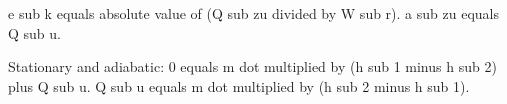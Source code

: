 e sub k equals absolute value of (Q sub zu divided by W sub r).  
a sub zu equals Q sub u.  

Stationary and adiabatic:  
0 equals m dot multiplied by (h sub 1 minus h sub 2) plus Q sub u.  
Q sub u equals m dot multiplied by (h sub 2 minus h sub 1).